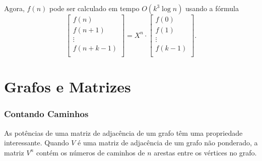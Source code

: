 \begin{samepage}
Agora, $f(n)$ pode ser calculado em
tempo $O(k^3 \log n)$ usando a fórmula
\[
 \begin{bmatrix}
  f(n) \\
  f(n+1) \\
  \vdots \\
  f(n+k-1) \\
 \end{bmatrix}
=
X^n \cdot
 \begin{bmatrix}
  f(0) \\
  f(1) \\
  \vdots \\
  f(k-1) \\
 \end{bmatrix}.
\]
\end{samepage}

\section{Grafos e Matrizes}

\subsubsection{Contando Caminhos}

As potências de uma matriz de adjacência de um grafo
têm uma propriedade interessante.
Quando $V$ é uma matriz de adjacência de um grafo não ponderado,
a matriz $V^n$ contém os números de caminhos de
$n$ arestas entre os vértices no grafo.

